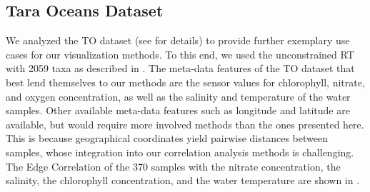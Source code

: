 
\subsection{Tara Oceans Dataset}
\label{ch:Visualization:sec:Results:sub:TaraDataset}

We analyzed the \acf{TO} dataset (see  for details)
to provide further exemplary use cases for our visualization methods.
To this end, we used the unconstrained  \ac{RT} with \num{2059} taxa
as described in .
The meta-data features of the \ac{TO} dataset that best lend themselves to our methods are the sensor values for
chlorophyll, nitrate, and oxygen concentration, as well as the salinity and temperature of the water samples.
Other available meta-data features such as longitude and latitude are available,
but would require more involved methods than the ones presented here.
This is because geographical coordinates yield pairwise distances between samples,
whose integration into our correlation analysis methods is challenging.
The Edge Correlation of the \num{370} samples with the nitrate concentration, the salinity, the chlorophyll concentration,
and the water temperature are shown in .



